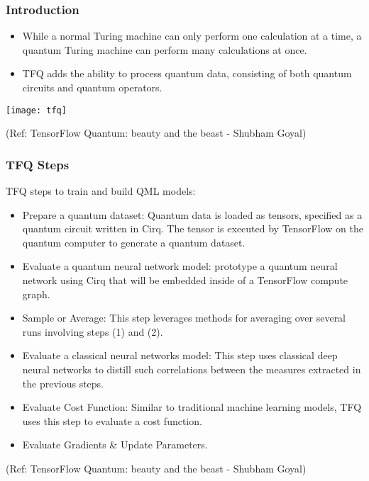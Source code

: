  \begin{frame}[fragile]\frametitle{Introduction}
 
\begin{itemize}
\item  While a normal Turing machine can only perform one calculation at a time, a quantum Turing machine can perform many calculations at once.
\item  TFQ adds the ability to process quantum data, consisting of both quantum circuits and quantum operators. 
\end{itemize}

\begin{center}
\texttt{[image: tfq]}
\end{center}
	
	
\tiny{(Ref: TensorFlow Quantum: beauty and the beast  - Shubham Goyal)}

\end{frame}

 \begin{frame}[fragile]\frametitle{TFQ Steps}
 
 TFQ steps to train and build QML models:
 
\begin{itemize}
\item  Prepare a quantum dataset: Quantum data is loaded as tensors, specified as a quantum circuit written in Cirq. The tensor is executed by TensorFlow on the quantum computer to generate a quantum dataset.
\item  Evaluate a quantum neural network model: prototype a quantum neural network using Cirq that will be embedded inside of a TensorFlow compute graph.
\item  Sample or Average: This step leverages methods for averaging over several runs involving steps (1) and (2).
\item  Evaluate a classical neural networks model: This step uses classical deep neural networks to distill such correlations between the measures extracted in the previous steps.
\item  Evaluate Cost Function: Similar to traditional machine learning models, TFQ uses this step to evaluate a cost function.
\item  Evaluate Gradients \& Update Parameters.
\end{itemize}

	
\tiny{(Ref: TensorFlow Quantum: beauty and the beast  - Shubham Goyal)}

\end{frame}

